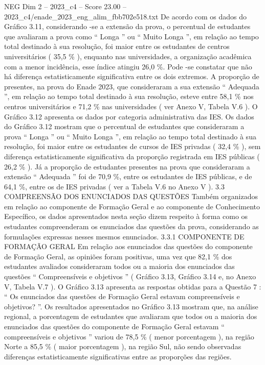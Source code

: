 \begin{textsample}{NEG Dim 2 – 2023\_c4 – Score 23.00 – 2023\_c4/enade\_2023\_eng\_alim\_fbb702e518.txt}
De acordo com os dados do Gráfico 3.11, considerando -se a extensão da prova, o percentual de estudantes que avaliaram a prova como “ Longa ” ou “ Muito Longa ”, em relação ao tempo total destinado à sua resolução, foi maior entre os estudantes de centros universitários ( 35,5 \% ), enquanto nas universidades, a organização acadêmica com a menor incidência, esse índice atingiu 26,0 \%.
Pode -se constatar que não há diferença estatisticamente significativa entre os dois extremos.
A proporção de presentes, na prova do Enade 2023, que consideraram a sua extensão “ Adequada ”, em relação ao tempo total destinado à sua resolução, esteve entre 58,1 \% nos centros universitários e 71,2 \% nas universidades ( ver Anexo V, Tabela V.6 ).
O Gráfico 3.12 apresenta os dados por categoria administrativa das IES.
Os dados do Gráfico 3.12 mostram que o percentual de estudantes que consideraram a prova “ Longa ” ou “ Muito Longa ”, em relação ao tempo total destinado à sua resolução, foi maior entre os estudantes de cursos de IES privadas ( 32,4 \% ), sem diferença estatisticamente significativa da proporção registrada em IES públicas ( 26,2 \% ).
Já a proporção de estudantes presentes na prova que consideraram a extensão “ Adequada ” foi de 70,9 \%, entre os estudantes de IES públicas, e de 64,1 \%, entre os de IES privadas ( ver a Tabela V.6 no Anexo V ). 3.3 COMPREENSÃO DOS ENUNCIADOS DAS QUESTÕES Também organizados em relação ao componente de Formação Geral e ao componente de Conhecimento Específico, os dados apresentados nesta seção dizem respeito à forma como os estudantes compreenderam os enunciados das questões da prova, considerando as formulações expressas nesses mesmos enunciados. 3.3.1 COMPONENTE DE FORMAÇÃO GERAL Em relação aos enunciados das questões do componente de Formação Geral, as opiniões foram positivas, uma vez que 82,1 \% dos estudantes avaliados consideraram todos ou a maioria dos enunciados das questões “ Compreensíveis e objetivos ” ( Gráfico 3.13, Gráfico 3.14 e, no Anexo V, Tabela V.7 ).
O Gráfico 3.13 apresenta as respostas obtidas para a Questão 7 : “ Os enunciados das questões de Formação Geral estavam compreensíveis e objetivos? ”.
Os resultados apresentados no Gráfico 3.13 mostram que, na análise regional, a porcentagem de estudantes que avaliaram que todos ou a maioria dos enunciados das questões do componente de Formação Geral estavam “ compreensíveis e objetivos ” variou de 78,5 \% ( menor porcentagem ), na região Norte a 85,5 \% ( maior porcentagem ), na região Sul, não sendo observadas diferenças estatisticamente significativas entre as proporções das regiões.

\end{textsample}
